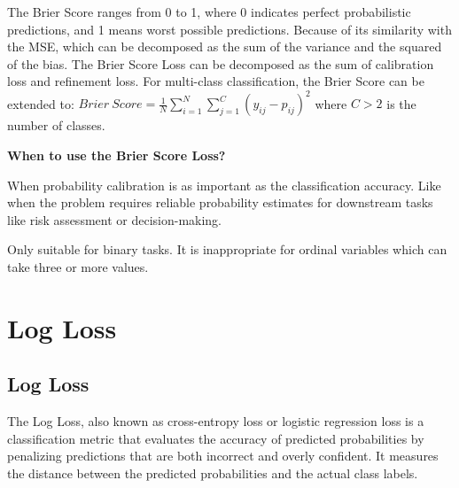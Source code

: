 The Brier Score ranges from 0 to 1, where 0 indicates perfect probabilistic predictions, and 1 means worst possible predictions. Because of its similarity with the MSE,
which can be decomposed as the sum of the variance and the squared of the bias. The Brier Score Loss can be decomposed as the sum of calibration loss and refinement loss.
For multi-class classification, the Brier Score can be extended to: ${Brier\ Score} = \frac{1}{N} \sum_{i=1}^{N} \sum_{j=1}^{C} (y_{ij} - p_{ij})^2$ where $C > 2$ is the number of classes.


\textbf{When to use the Brier Score Loss?}

When probability calibration is as important as the classification accuracy. Like when the problem requires reliable probability estimates for downstream tasks
like risk assessment or decision-making.

{
\item Only suitable for binary tasks. It is inappropriate for ordinal variables which can take three or more values.
}

\clearpage
\thispagestyle{classificationstyle}
\section{Log Loss}
\subsection{Log Loss}

The Log Loss, also known as cross-entropy loss or logistic regression loss is a classification metric that evaluates the accuracy of predicted probabilities by
penalizing predictions that are both incorrect and overly confident. It measures the distance between the predicted probabilities and the actual class labels.

\begin{center}
\end{center}

